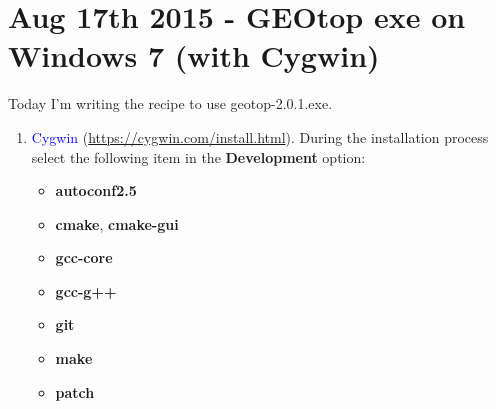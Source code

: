 \section{Aug 17th 2015 - GEOtop exe on Windows 7 (with Cygwin)}\label{sec:20150817}

Today I'm writing the recipe to use geotop-2.0.1.exe.

\begin{enumerate}
\item \textcolor{blue}{Cygwin} (\url{https://cygwin.com/install.html}). During the installation process select the following item in the \textbf{Development} option:
  \begin{itemize}
  \item \textbf{autoconf2.5}
  \item \textbf{cmake}, \textbf{cmake-gui}
  \item \textbf{gcc-core}
  \item \textbf{gcc-g++}
  \item \textbf{git}
  \item \textbf{make}
  \item \textbf{patch}
  \end{itemize}
\end{enumerate}
